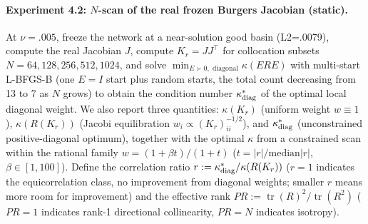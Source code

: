 \documentclass[11pt]{article}
\numberwithin{equation}{section}
\begin{document}
\paragraph{Experiment 4.2: $N$-scan of the real frozen Burgers Jacobian (static).}
At $\nu=.005$, freeze the network at a near-solution good basin (L2=.0079), compute the real Jacobian $J$, compute $K_r=JJ^\top$ for collocation subsets $N=64,128,256,512,1024$, and solve $\min_{E\succ0,\text{ diagonal}}\kappa(ERE)$ with multi-start L-BFGS-B (one $E=I$ start plus random starts, the total count decreasing from 13 to 7 as $N$ grows) to obtain the condition number $\kappa^*_{\rm diag}$ of the optimal local diagonal weight. We also report three quantities: $\kappa(K_r)$ (uniform weight $w\equiv1$), $\kappa(R(K_r))$ (Jacobi equilibration $w_i\propto(K_r)_{ii}^{-1/2}$), and $\kappa^*_{\rm diag}$ (unconstrained positive-diagonal optimum), together with the optimal $\kappa$ from a constrained scan within the rational family $w=(1+\beta t)/(1+t)$ ($t=|r|/\mathrm{median}|r|$, $\beta\in[1,100]$). Define the correlation ratio $r:=\kappa^*_{\rm diag}/\kappa(R(K_r))$ ($r=1$ indicates the equicorrelation class, no improvement from diagonal weights; smaller $r$ means more room for improvement) and the effective rank $PR:=\operatorname{tr}(R)^2/\operatorname{tr}(R^2)$ ($PR=1$ indicates rank-1 directional collinearity, $PR=N$ indicates isotropy).
\end{document}
